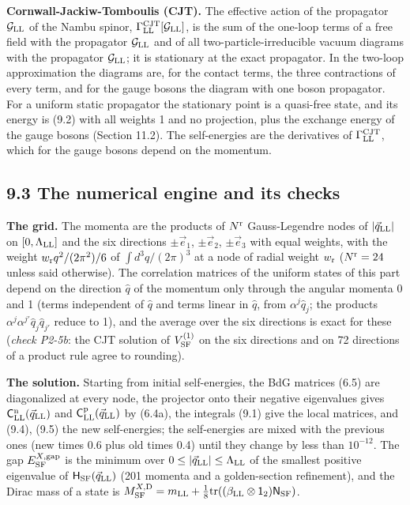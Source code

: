 \documentclass[
  10pt,
]{article}
\begin{document}
\textbf{Cornwall-Jackiw-Tomboulis (CJT).} The effective action of the
propagator \(\mathcal G_{\rm LL}\) of the Nambu spinor,
\(\Gamma^{\rm CJT}_{\rm LL}[\mathcal G_{\rm LL}]\), is the sum of the
one-loop terms of a free field with the propagator
\(\mathcal G_{\rm LL}\) and of all two-particle-irreducible vacuum
diagrams with the propagator \(\mathcal G_{\rm LL}\); it is stationary
at the exact propagator. In the two-loop approximation the diagrams are,
for the contact terms, the three contractions of every term, and for the
gauge bosons the diagram with one boson propagator. For a uniform static
propagator the stationary point is a quasi-free state, and its energy is
(9.2) with all weights 1 and no projection, plus the exchange energy of
the gauge bosons (Section 11.2). The self-energies are the derivatives
of \(\Gamma^{\rm CJT}_{\rm LL}\), which for the gauge bosons depend on
the momentum.

\hypertarget{the-numerical-engine-and-its-checks}{%
\subsection{9.3 The numerical engine and its
checks}\label{the-numerical-engine-and-its-checks}}

\textbf{The grid.} The momenta are the products of \(N^{\rm r}\)
Gauss-Legendre nodes of \(\lvert\vec q_{\rm LL}\rvert\) on
\([0,\Lambda_{\rm LL}]\) and the six directions \(\pm\vec e_1\),
\(\pm\vec e_2\), \(\pm\vec e_3\) with equal weights, with the weight
\(w_{\rm r}q^2/(2\pi^2)/6\) of \(\int d^3q/(2\pi)^3\) at a node of
radial weight \(w_{\rm r}\) (\(N^{\rm r}=24\) unless said otherwise).
The correlation matrices of the uniform states of this part depend on
the direction \(\hat q\) of the momentum only through the angular
momenta 0 and 1 (terms independent of \(\hat q\) and terms linear in
\(\hat q\), from \(\alpha^j\hat q_j\); the products
\(\alpha^j\alpha^{j'}\hat q_j\hat q_{j'}\) reduce to 1), and the average
over the six directions is exact for these (\emph{check P2-5b}: the CJT
solution of \(V^{(1)}_{\rm SF}\) on the six directions and on 72
directions of a product rule agree to rounding).

\textbf{The solution.} Starting from initial self-energies, the BdG
matrices (6.5) are diagonalized at every node, the projector onto their
negative eigenvalues gives
\(\mathsf C^{\rm n}_{\rm LL}(\vec q_{\rm LL})\) and
\(\mathsf C^{\rm p}_{\rm LL}(\vec q_{\rm LL})\) by (6.4a), the integrals
(9.1) give the local matrices, and (9.4), (9.5) the new self-energies;
the self-energies are mixed with the previous ones (new times 0.6 plus
old times 0.4) until they change by less than \(10^{-12}\). The gap
\(E^{X,{\rm gap}}_{\rm SF}\) is the minimum over
\(0\le\lvert\vec q_{\rm LL}\rvert\le\Lambda_{\rm LL}\) of the smallest
positive eigenvalue of \(\mathsf H_{\rm SF}(\vec q_{\rm LL})\) (201
momenta and a golden-section refinement), and the Dirac mass of a state
is
\(M^{X,{\rm D}}_{\rm SF}=m_{\rm LL}+\tfrac18\mathrm{tr}((\beta_{\rm LL}\otimes\mathsf 1_2)\mathsf N_{\rm SF})\).
\end{document}
